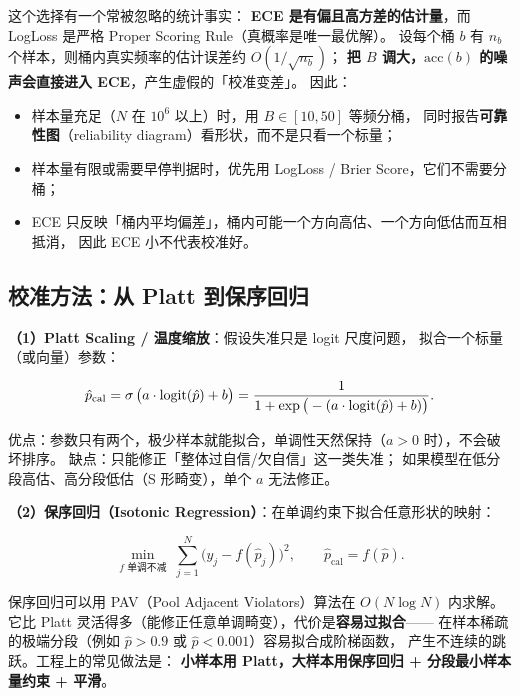 \begin{insight}
这个选择有一个常被忽略的统计事实：
\textbf{ECE 是有偏且高方差的估计量}，而 LogLoss 是严格 Proper Scoring Rule（真概率是唯一最优解）。
设每个桶 $b$ 有 $n_b$ 个样本，则桶内真实频率的估计误差约 $O(1/\sqrt{n_b})$；
\textbf{把 $B$ 调大，$\mathrm{acc}(b)$ 的噪声会直接进入 ECE}，产生虚假的「校准变差」。
因此：
\begin{itemize}
  \item 样本量充足（$N$ 在 $10^6$ 以上）时，用 $B \in [10, 50]$ 等频分桶，
        同时报告\textbf{可靠性图}（reliability diagram）看形状，而不是只看一个标量；
  \item 样本量有限或需要早停判据时，优先用 LogLoss / Brier Score，它们不需要分桶；
  \item ECE 只反映「桶内平均偏差」，桶内可能一个方向高估、一个方向低估而互相抵消，
        因此 ECE 小不代表校准好。
\end{itemize}
\end{insight}

\subsection{校准方法：从 Platt 到保序回归}

\textbf{（1）Platt Scaling / 温度缩放}：假设失准只是 logit 尺度问题，
拟合一个标量（或向量）参数：

\begin{equation}
\hat{p}_{\text{cal}} = \operatorname{\sigma}\big( a \cdot \mathrm{logit}(\hat{p}) + b \big)
= \frac{1}{1 + \exp\big( -(a \cdot \mathrm{logit}(\hat{p}) + b) \big)} .
\label{eq:platt}
\end{equation}

优点：参数只有两个，极少样本就能拟合，单调性天然保持（$a > 0$ 时），不会破坏排序。
缺点：只能修正「整体过自信/欠自信」这一类失准；
如果模型在低分段高估、高分段低估（S 形畸变），单个 $a$ 无法修正。

\textbf{（2）保序回归（Isotonic Regression）}：在单调约束下拟合任意形状的映射：

\begin{equation}
\min_{f \text{ 单调不减}} \; \sum_{j=1}^{N} \big( y_j - f(\hat{p}_j) \big)^2 ,
\qquad \hat{p}_{\text{cal}} = f(\hat{p}) .
\label{eq:isotonic}
\end{equation}

保序回归可以用 PAV（Pool Adjacent Violators）算法在 $O(N \log N)$ 内求解。
它比 Platt 灵活得多（能修正任意单调畸变），代价是\textbf{容易过拟合}——
在样本稀疏的极端分段（例如 $\hat{p} > 0.9$ 或 $\hat{p} < 0.001$）容易拟合成阶梯函数，
产生不连续的跳跃。工程上的常见做法是：
\textbf{小样本用 Platt，大样本用保序回归 + 分段最小样本量约束 + 平滑}。


